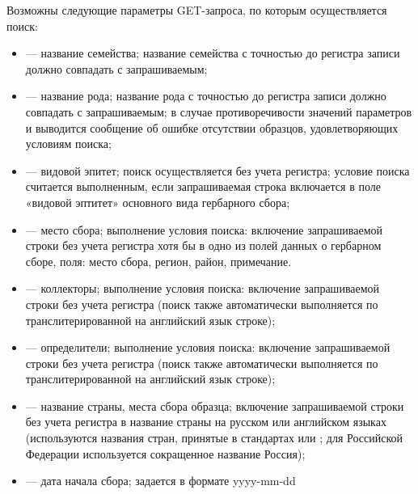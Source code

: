 \documentclass[letterpaper,10pt,russian]{sphinxmanual}
\begin{document}
Возможны следующие параметры GET-запроса, по которым осуществляется поиск:
\begin{itemize}
\item {} 
 — название семейства; название семейства с точностью до регистра записи должно совпадать с запрашиваемым;

\item {} 
 — название рода; название рода с точностью до регистра записи должно совпадать с запрашиваемым; в случае противоречивости значений параметров  и  выводится сообщение об ошибке \textendash{} отсутствии образцов, удовлетворяющих условиям поиска;

\item {} 
 — видовой эпитет; поиск осуществляется без учета регистра; условие поиска считается выполненным, если запрашиваемая строка включается в поле «видовой эптитет» основного вида гербарного сбора;

\item {} 
 — место сбора; выполнение условия поиска: включение запрашиваемой строки без учета регистра хотя бы в одно из полей данных о гербарном сборе, поля: место сбора, регион, район, примечание.

\item {} 
 — коллекторы; выполнение условия поиска: включение запрашиваемой строки без учета регистра (поиск также автоматически выполняется по транслитерированной на английский язык строке);

\item {} 
 — определители; выполнение условия поиска: включение запрашиваемой строки без учета регистра (поиск также автоматически выполняется по транслитерированной на английский язык строке);

\item {} 
 — название страны, места сбора образца; включение запрашиваемой строки без учета регистра в название страны на русском или английском языках (используются названия стран, принятые в стандартах  или ; для Российской Федерации используется сокращенное название Россия);

\item {} 
 — дата начала сбора; задается в формате yyyy-mm-dd


\end{itemize}
\end{document}
